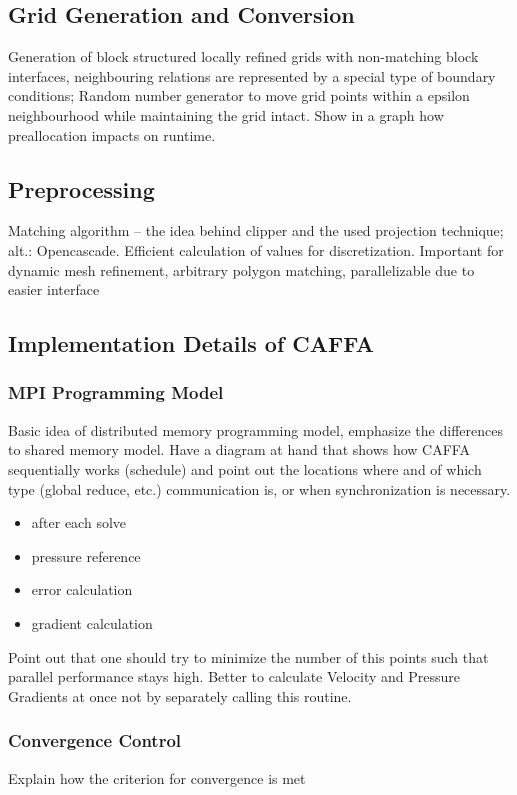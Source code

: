    \subsection{Grid Generation and Conversion}

      Generation of block structured locally refined grids with non-matching block interfaces, neighbouring relations are represented by a special type of boundary conditions; Random number generator to move grid points within a epsilon neighbourhood while maintaining the grid intact. Show in a graph how preallocation impacts on runtime.
    \subsection{Preprocessing}
    Matching algorithm -- the idea behind clipper and the used projection technique; alt.: Opencascade. Efficient calculation of values for discretization. Important for dynamic mesh refinement, arbitrary polygon matching, parallelizable due to easier interface

    \subsection{Implementation Details of CAFFA}

      \subsubsection{MPI Programming Model}
        Basic idea of distributed memory programming model, emphasize the differences to shared memory model. Have a diagram at hand that shows how CAFFA sequentially works (schedule) and point out the locations where and of which type (global reduce, etc.) communication is, or when synchronization is necessary.
        \begin{itemize}
          \item after each solve
          \item pressure reference
          \item error calculation
          \item gradient calculation
        \end{itemize}
        
        Point out that one should try to minimize the number of this points such that parallel performance stays high. Better to calculate Velocity and Pressure Gradients at once not by separately calling this routine.

        \subsubsection{Convergence Control} 
        \label{sec:convergence}
        Explain how the criterion for convergence is met 


